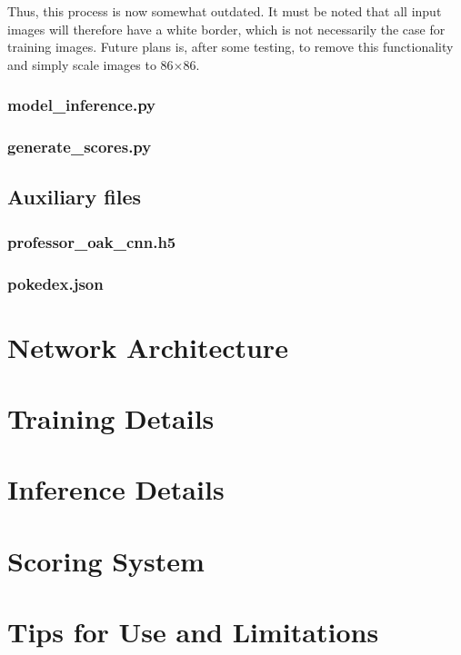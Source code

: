 \documentclass[onecolumn]{article}
\begin{document}
Thus, this process is now somewhat outdated. It must be noted that all input images will therefore have a white border, which is not necessarily the case for training images. Future plans is, after some testing, to remove this functionality and simply scale images to 86$\times$86.

\subsubsection*{model\_inference.py}

\subsubsection*{generate\_scores.py}

\subsection*{Auxiliary files}

\subsubsection*{professor\_oak\_cnn.h5}

\subsubsection*{pokedex.json}

\section*{Network Architecture}

\section*{Training Details}

\section*{Inference Details}

\section*{Scoring System}

\section*{Tips for Use and Limitations}




\end{document}
